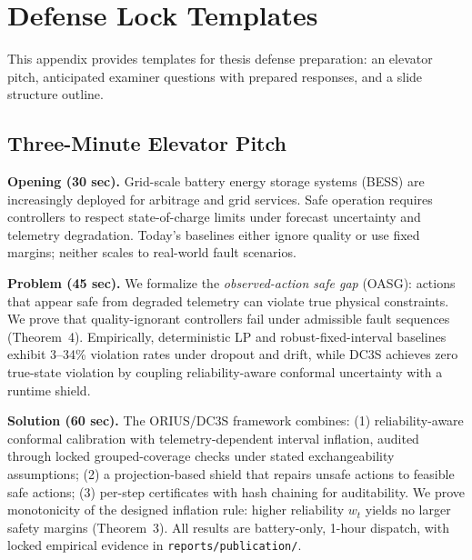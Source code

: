 \chapter{Defense Lock Templates}
\label{app:defense-lock-templates}

This appendix provides templates for thesis defense preparation: an elevator pitch, anticipated examiner questions with prepared responses, and a slide structure outline.

\section{Three-Minute Elevator Pitch}
\label{sec:elevator-pitch}

\textbf{Opening (30 sec).} Grid-scale battery energy storage systems (BESS) are increasingly deployed for arbitrage and grid services. Safe operation requires controllers to respect state-of-charge limits under forecast uncertainty and telemetry degradation. Today's baselines either ignore quality or use fixed margins; neither scales to real-world fault scenarios.

\textbf{Problem (45 sec).} We formalize the \emph{observed-action safe gap} (OASG): actions that appear safe from degraded telemetry can violate true physical constraints. We prove that quality-ignorant controllers fail under admissible fault sequences (Theorem~4). Empirically, deterministic LP and robust-fixed-interval baselines exhibit 3--34\% violation rates under dropout and drift, while DC3S achieves zero true-state violation by coupling reliability-aware conformal uncertainty with a runtime shield.

\textbf{Solution (60 sec).} The ORIUS/DC3S framework combines: (1) reliability-aware conformal calibration with telemetry-dependent interval inflation, audited through locked grouped-coverage checks under stated exchangeability assumptions; (2) a projection-based shield that repairs unsafe actions to feasible safe actions; (3) per-step certificates with hash chaining for auditability. We prove monotonicity of the designed inflation rule: higher reliability $w_t$ yields no larger safety margins (Theorem~3). All results are battery-only, 1-hour dispatch, with locked empirical evidence in \texttt{reports/publication/}.

